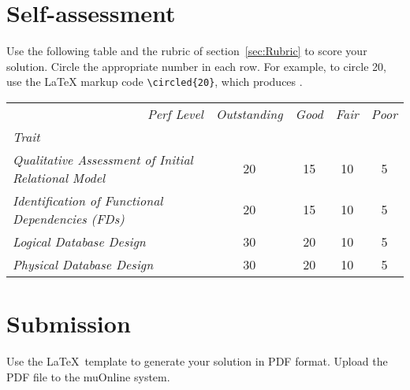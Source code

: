 \documentclass[11pt]{article}
\newcommand*\circled[1]{\tikz[baseline=(char.base)]{
  \node[shape=circle,draw,inner sep=2pt] (char) {#1};}}
\begin{document}
\section{Self-assessment}

Use the following table and the rubric of section~\ref{sec:Rubric} to score your solution. Circle the appropriate number in each row. For example, to circle 20, use the \LaTeX{} markup code \verb+\circled{20}+, which produces \circled{20}.

\vspace*{0.2in}

\begin{tabular}{lcccc} \\ \toprule
\multicolumn{1}{r}{\emph{Perf Level}} & \emph{Outstanding} & \emph{Good} & \emph{Fair} & \emph{Poor} \\ 
\emph{Trait} & & & & \\ \toprule


\emph{Qualitative Assessment of Initial Relational Model} &  20 & 15 & 10 & 5 \\ \bottomrule


\emph{Identification of Functional Dependencies (FDs)} &  20 & 15 & 10 & 5 \\ \midrule


\emph{Logical Database Design} & 30  &  20  & 10  & 5 \\ \midrule


\emph{Physical Database Design} & 30  &  20  & 10  & 5 \\ \midrule

\end{tabular}



\section{Submission}

Use the \LaTeX{}\ template to generate your solution in PDF format. Upload the PDF file to the muOnline system.
\end{document}
